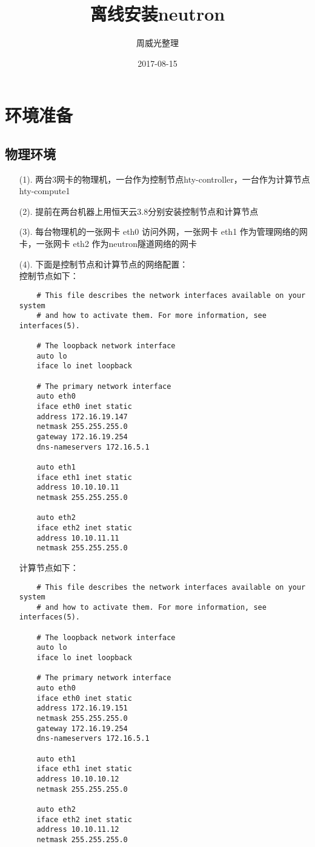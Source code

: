\documentclass[a4paper,left=1.5cm,right=1.5cm,11pt]{article}
\title{离线安装neutron}
\author{周威光整理}
\date{2017-08-15}
\begin{document}
\maketitle
\clearpage
\tableofcontents
\clearpage
\section{环境准备}
\subsection{物理环境}
\begin{itemize}
	\item[(1).]两台3网卡的物理机，一台作为控制节点hty-controller，一台作为计算节点hty-compute1
	\item[(2).]提前在两台机器上用恒天云3.8分别安装控制节点和计算节点
	\item[(3).]每台物理机的一张网卡 eth0 访问外网，一张网卡 eth1 作为管理网络的网卡，一张网卡 eth2 作为neutron隧道网络的网卡
	\item[(4).]下面是控制节点和计算节点的网络配置：\\
	控制节点如下：
	\begin{lstlisting}
	# This file describes the network interfaces available on your system
	# and how to activate them. For more information, see interfaces(5).

	# The loopback network interface
	auto lo
	iface lo inet loopback

	# The primary network interface
	auto eth0
	iface eth0 inet static
	address 172.16.19.147
	netmask 255.255.255.0
	gateway 172.16.19.254
	dns-nameservers 172.16.5.1

	auto eth1
	iface eth1 inet static
	address 10.10.10.11
	netmask 255.255.255.0

	auto eth2
	iface eth2 inet static
	address 10.10.11.11
	netmask 255.255.255.0
	\end{lstlisting}
	计算节点如下：
	\begin{lstlisting}
	# This file describes the network interfaces available on your system
	# and how to activate them. For more information, see interfaces(5).

	# The loopback network interface
	auto lo
	iface lo inet loopback

	# The primary network interface
	auto eth0
	iface eth0 inet static
	address 172.16.19.151
	netmask 255.255.255.0
	gateway 172.16.19.254
	dns-nameservers 172.16.5.1

	auto eth1
	iface eth1 inet static
	address 10.10.10.12
	netmask 255.255.255.0

	auto eth2
	iface eth2 inet static
	address 10.10.11.12 
	netmask 255.255.255.0
	\end{lstlisting}
\end{itemize}
\end{document}
